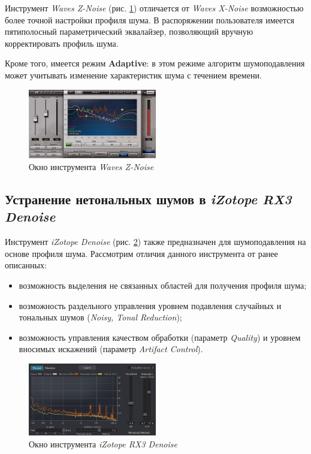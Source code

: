 \documentclass[oneside, final, 14pt]{extreport}
\begin{document}
Инструмент \emph{Waves Z-Noise} (рис. \ref{pic-znoise-01}) отличается от \emph{Waves X-Noise} возможностью более точной настройки профиля шума. В распоряжении пользователя имеется пятиполосный параметрический эквалайзер, позволяющий вручную корректировать профиль шума.

Кроме того, имеется режим \textbf{Adaptive}: в этом режиме алгоритм шумоподавления может учитывать изменение характеристик шума с течением времени.

\begin{figure}[h]
    \centering
    \includegraphics[width=0.5\textwidth]{pic-znoise-01}
    \caption{Окно инструмента \textit{Waves Z-Noise}}
    \label{pic-znoise-01}
\end{figure}

\subsection{Устранение нетональных шумов в \emph{iZotope RX3 Denoise}}
Инструмент \emph{iZotope Denoise} (рис. \ref{pic-rx3denoise-01}) также предназначен для шумоподавления на основе профиля шума. Рассмотрим отличия данного инструмента от ранее описанных:
\begin{itemize}
  \item возможность выделения не связанных областей для получения профиля шума;
  \item возможность раздельного управления уровнем подавления случайных и тональных шумов (\emph{Noisy, Tonal Reduction});
  \item возможность управления качеством обработки (параметр \emph{Quality}) и уровнем вносимых искажений (параметр \emph{Artifact Control}).
\end{itemize}

\begin{figure}[h]
    \centering
    \includegraphics[width=0.5\textwidth]{pic-rx3denoise-01}
    \caption{Окно инструмента \textit{iZotope RX3 Denoise}}
    \label{pic-rx3denoise-01}
\end{figure}
\end{document}
